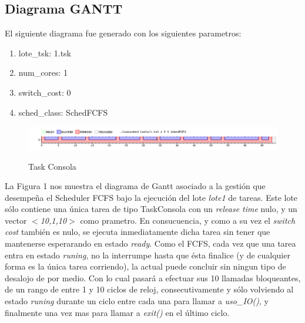 \subsection{Diagrama GANTT}

El siguiente diagrama fue generado con los siguientes parametros:

\begin{enumerate}
	\item lote\_tsk: 1.tsk
	\item num\_cores: 1
	\item switch\_cost: 0
	\item sched\_class: SchedFCFS
\end{enumerate}

\begin{figure}[h]
    \includegraphics[width=\linewidth]{images/1.png}
    \label{fig:Task Consola}
    \caption{Task Consola}
\end{figure}

La Figura 1 nos muestra el diagrama de Gantt asociado a la gesti\'on que desempeña el Scheduler FCFS bajo la ejecuci\'on del lote \textit{lote1} de tareas. Este lote s\'olo contiene una \'unica tarea de tipo TaskConsola con un \textit{release time} nulo, y un vector \textit{$<$10,1,10$>$} como prametro. En consucuencia, y como a su vez el \textit{switch cost} tambi\'en es nulo, se ejecuta inmediatamente dicha tarea sin tener que mantenerse esperarando en estado \textit{ready}. Como el FCFS, cada vez que una tarea entra en estado \textit{runing}, no la interrumpe hasta que \'esta finalice (y de cualquier forma es la \'unica tarea corriendo), la actual puede concluir sin ningun tipo de desalojo de por medio. Con lo cual pasar\'a a efectuar sus 10 llamadas bloqueantes, de un rango de entre 1 y 10 ciclos de reloj, consecutivamente y s\'olo volviendo al estado \textit{runing} durante un ciclo entre cada una para llamar a \textit{uso\_IO()}, y finalmente una vez mas para llamar a \textit{exit()} en el \'ultimo ciclo.